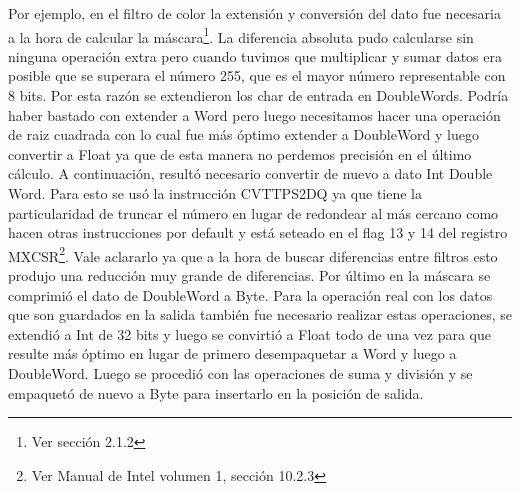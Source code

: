  Por ejemplo, en el filtro de color la extensi\'on y conversi\'on del dato fue necesaria a la hora de
 calcular la m\'ascara\footnote{Ver secci\'on 2.1.2}. La diferencia absoluta pudo calcularse sin ninguna operaci\'on extra pero cuando tuvimos que 
multiplicar y sumar datos era posible que se superara el n\'umero 255, que es el mayor n\'umero representable con 8 bits. Por esta raz\'on se extendieron
los char de entrada en DoubleWords. Podr\'ia haber bastado con extender a Word pero luego necesitamos hacer una operaci\'on de raiz cuadrada con lo cual fue
m\'as \'optimo extender a DoubleWord y luego convertir a Float ya que de esta manera no perdemos precisi\'on en el \'ultimo c\'alculo. A continuaci\'on, 
result\'o necesario convertir de nuevo a dato Int Double Word. Para esto se us\'o la instrucci\'on CVTTPS2DQ ya que tiene la particularidad de truncar el 
n\'umero en lugar de redondear al m\'as cercano como hacen otras instrucciones por default y est\'a seteado en el flag 13 y 14 del registro MXCSR\footnote{Ver Manual de Intel volumen 1, secci\'on 10.2.3}.
 Vale aclararlo ya que a la hora de buscar diferencias entre filtros esto produjo una reducci\'on muy grande de diferencias. Por \'ultimo en la m\'ascara se comprimi\'o el dato 
de DoubleWord a Byte. Para la operaci\'on real con los datos que son guardados en la salida tambi\'en fue necesario realizar estas operaciones, se extendi\'o a 
Int de 32 bits y luego se convirti\'o a Float todo de una vez para que resulte m\'as \'optimo en lugar de primero desempaquetar a Word y luego a DoubleWord. Luego se
procedi\'o con las operaciones de suma y divisi\'on y se empaquet\'o de nuevo a Byte para insertarlo en la posici\'on de salida.

